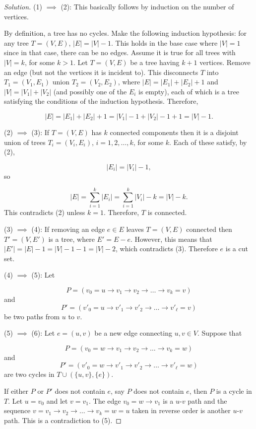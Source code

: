 \begin{proof}[Solution]
\noindent
(1) $\implies$ (2):
This basically follows by induction on the number of vertices.

By definition, a tree has no cycles. Make the following
induction hypothesis: for any tree $T=(V,E)$, $|E|=|V|-1$.
This holds in the base case where $|V|=1$ since in that case,
there can be no edges. Assume it is true for all trees with
$|V|=k$, for some $k>1$. Let $T=(V,E)$ be a tree having
$k+1$ vertices. Remove an edge (but not the vertices
it is incident to). This
disconnects
$T$ into $T_1=(V_1, E_1)$ union $T_2 = (V_2, E_2)$,
where $|E|=|E_1|+|E_2|+1$ and $|V|=|V_1|+|V_2|$
(and possibly one of the $E_i$ is empty),
each of which is a tree satisfying the conditions of the induction
hypothesis. Therefore,

\[
|E|=|E_1|+|E_2|+1 = |V_1| - 1 + |V_2| - 1 + 1 =|V|-1.
\]

\noindent
(2) $\implies$ (3):
If $T=(V,E)$ has $k$ connected components then it is a disjoint
union of trees $T_i=(V_i,E_i)$, $i=1,2,\dots, k$,
for some $k$. Each of these satisfy, by (2),

\[
|E_i|=|V_i|-1,
\]
so

\[
|E|=\sum_{i=1}^k |E_i|
=\sum_{i=1}^k |V_i| -k
=|V|-k.
\]
This contradicts (2) unless $k=1$.
Therefore, $T$ is connected.

\noindent
(3) $\implies$ (4):
If removing an edge $e\in E$ leaves $T=(V,E)$ connected then
$T'=(V,E')$ is a tree, where $E'=E-e$.
However, this means that $|E'|=|E|-1=|V|-1-1=|V|-2$,
which contradicts (3). Therefore $e$ is a cut set.

\noindent
(4) $\implies$ (5):
Let

\[
P = (v_0=u\to v_1 \to v_2 \to \dots \to v_k = v)
\]
and
\[
P' = (v'_0=u\to v'_1 \to v'_2 \to \dots \to v'_\ell = v)
\]
be two paths from $u$ to $v$.

\noindent
(5) $\implies$ (6):
Let $e=(u,v)$ be a new edge connecting $u,v\in V$.
Suppose that

\[
P = (v_0=w\to v_1 \to v_2 \to \dots \to v_k = w)
\]
and
\[
P' = (v'_0=w\to v'_1 \to v'_2 \to \dots \to v'_\ell = w)
\]
are two cycles in $T\cup (\{u,v\},\{e\})$.

If either $P$ or $P'$ does not contain $e$,
say $P$ does not contain $e$, then $P$ is a
cycle in $T$. Let $u = v_0$ and let $v=v_1$.
The edge $v_0=w\to v_1$ is a $u$-$v$ path
and the sequence $v=v_1 \to v_2 \to \dots \to v_k=w=u$
taken in reverse order is another $u$-$v$ path.
This is a contradiction to (5).


\end{proof}
